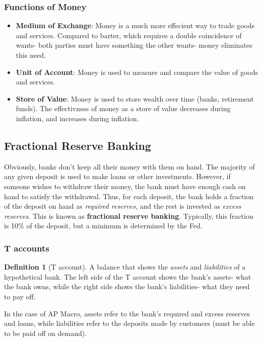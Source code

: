 \documentclass[12pt, a4paper]{article}
\theoremstyle{definition}
\newtheorem{definition}{Definition}
\begin{document}
\subsubsection{Functions of Money}
\begin{itemize}
    \item \textbf{Medium of Exchange}: Money is a much more effecient way to trade goods and services. Compared to barter, which requires a double coincidence of wants- both parties must have something the other wants- money eliminates this need.
    \item \textbf{Unit of Account}: Money is used to measure and compare the value of goods and services.
    \item \textbf{Store of Value}: Money is used to store wealth over time (banks, retirement funds). The effectivness of money as a store of value decreases during inflation, and increases during inflation.
\end{itemize}

\subsection{Fractional Reserve Banking}
Obviously, banks don't keep all their money with them on hand.
The majority of any given deposit is used to make loans or other investments.
However, if someone wishes to withdraw their money, the bank must have enough cash on hand to satisfy the withdrawal.
Thus, for each deposit, the bank holds a fraction of the deposit on hand as \textit{required reserves}, and the rest is invested as \textit{excess reserves}.
This is known as \textbf{fractional reserve banking}.
Typically, this fraction is 10\% of the deposit, but a minimum is determined by the Fed.

\subsubsection{T accounts}
\begin{definition}[T account]
    A balance that shows the \textit{assets} and \textit{liabilities} of a hypothetical bank.
    The left side of the T account shows the bank's assets- what the bank owns, while the right side shows the bank's liabilities- what they need to pay off.
\end{definition}

In the case of AP Macro, assets refer to the bank's required and excess reserves and loans, while liabilities refer to the deposits made by customers (must be able to be paid off on demand).
\end{document}
